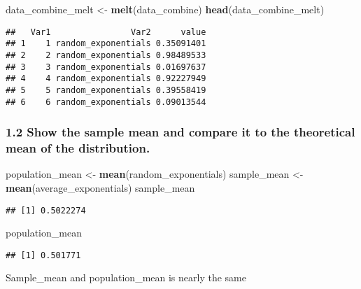 \documentclass[]{article}
\newenvironment{Shaded}{\begin{snugshade}}{\end{snugshade}}
\newcommand{\KeywordTok}[1]{\textcolor[rgb]{0.13,0.29,0.53}{\textbf{#1}}}
\newcommand{\DataTypeTok}[1]{\textcolor[rgb]{0.13,0.29,0.53}{#1}}
\newcommand{\StringTok}[1]{\textcolor[rgb]{0.31,0.60,0.02}{#1}}
\newcommand{\OperatorTok}[1]{\textcolor[rgb]{0.81,0.36,0.00}{\textbf{#1}}}
\newcommand{\NormalTok}[1]{#1}
\begin{document}
\begin{Shaded}
\begin{Highlighting}[]
\NormalTok{data_combine_melt <-}\StringTok{ }\KeywordTok{melt}\NormalTok{(data_combine)}
\KeywordTok{head}\NormalTok{(data_combine_melt)}
\end{Highlighting}
\end{Shaded}

\begin{verbatim}
##   Var1                Var2      value
## 1    1 random_exponentials 0.35091401
## 2    2 random_exponentials 0.98489533
## 3    3 random_exponentials 0.01697637
## 4    4 random_exponentials 0.92227949
## 5    5 random_exponentials 0.39558419
## 6    6 random_exponentials 0.09013544
\end{verbatim}

\subsubsection{1.2 Show the sample mean and compare it to the
theoretical mean of the
distribution.}\label{show-the-sample-mean-and-compare-it-to-the-theoretical-mean-of-the-distribution.}

\begin{Shaded}
\begin{Highlighting}[]
\NormalTok{population_mean <-}\StringTok{ }\KeywordTok{mean}\NormalTok{(random_exponentials)}
\NormalTok{sample_mean <-}\StringTok{ }\KeywordTok{mean}\NormalTok{(average_exponentials)}
\NormalTok{sample_mean}
\end{Highlighting}
\end{Shaded}

\begin{verbatim}
## [1] 0.5022274
\end{verbatim}

\begin{Shaded}
\begin{Highlighting}[]
\NormalTok{population_mean}
\end{Highlighting}
\end{Shaded}

\begin{verbatim}
## [1] 0.501771
\end{verbatim}

Sample\_mean and population\_mean is nearly the same

\begin{Shaded}
\end{Shaded}
\end{document}
